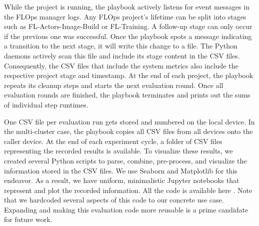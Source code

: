 While the project is running, the playbook actively listens for event messages in the FLOps manager logs.
Any FLOps project's lifetime can be split into stages such as FL-Actors-Image-Build or FL-Training.
A follow-up stage can only occur if the previous one was successful.
Once the playbook spots a message indicating a transition to the next stage, it will write this change to a file.
The Python daemons actively scan this file and include its stage content in the CSV files.
Consequently, the CSV files that include the system metrics also include the respective project stage and timestamp.
At the end of each project, the playbook repeats its cleanup steps and starts the next evaluation round.
Once all evaluation rounds are finished, the playbook terminates and prints out the sums of individual step runtimes. 

One CSV file per evaluation run gets stored and numbered on the local device.
In the multi-cluster case, the playbook copies all CSV files from all devices onto the caller device.
At the end of each experiment cycle, a folder of CSV files representing the recorded results is available.
To visualize these results, we created several Python scripts to parse, combine, pre-process, and visualize the information stored in the CSV files.
We use Seaborn and Matplotlib for this endeavor.
As a result, we have uniform, minimalistic Jupyter notebooks that represent and plot the recorded information.
All the code is available here \cite{cli_code}.
Note that we hardcoded several aspects of this code to our concrete use case.
Expanding and making this evaluation code more reusable is a prime candidate for future work.